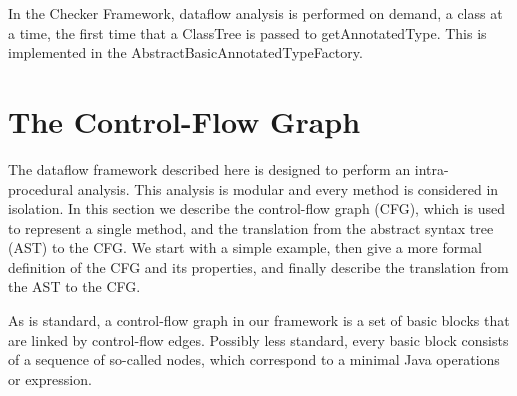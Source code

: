     
    In the Checker Framework, dataflow analysis is performed on demand, a class at a time, the first time that a ClassTree is passed to getAnnotatedType.   This is implemented in the AbstractBasicAnnotatedTypeFactory.
    
    






\section{The Control-Flow Graph}
\label{sec:cfg}


The dataflow framework described here is designed to perform an intra-procedural analysis.
This analysis is modular and every method is considered in isolation. In this section
we describe the control-flow graph (CFG), which is used to represent a single method, and the
translation from the abstract syntax tree (AST) to the CFG. We start with a simple
example, then give a more formal definition of the CFG and its properties, and finally
describe the translation from the AST to the CFG.

As is standard, a control-flow graph in our framework is a set of basic blocks
that are linked by control-flow edges. Possibly less standard,
every basic block consists of a sequence
of so-called nodes, which correspond to a minimal Java operations or expression.



